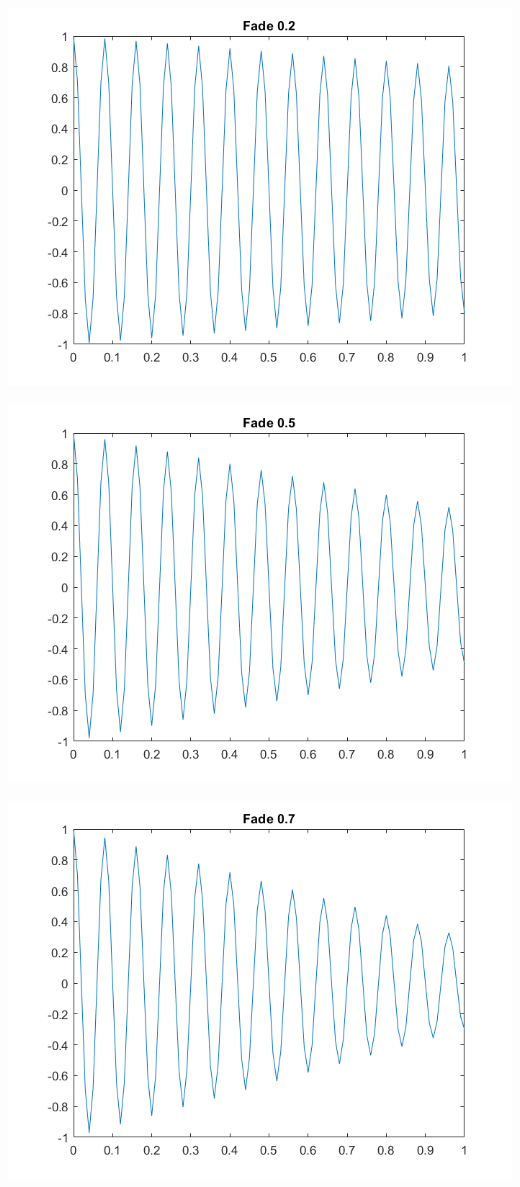 \documentclass[11pt]{article}
\begin{document}
\includegraphics[scale=0.7]{fade0.2.png}

\includegraphics[scale=0.7]{fade0.5.png}

\includegraphics[scale=0.7]{fade0.7.png}
\end{document}
